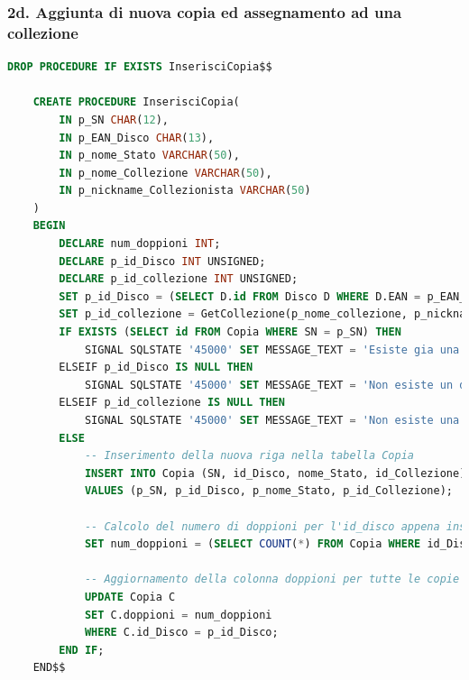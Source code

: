 \documentclass{article}
\begin{document}
\subsubsection*{2d. Aggiunta di nuova copia ed assegnamento ad una collezione}
\begin{lstlisting}[language=SQL]
    DROP PROCEDURE IF EXISTS InserisciCopia$$

    CREATE PROCEDURE InserisciCopia(
        IN p_SN CHAR(12),
        IN p_EAN_Disco CHAR(13),
        IN p_nome_Stato VARCHAR(50),
        IN p_nome_Collezione VARCHAR(50),
        IN p_nickname_Collezionista VARCHAR(50)
    )
    BEGIN
        DECLARE num_doppioni INT;
        DECLARE p_id_Disco INT UNSIGNED;
        DECLARE p_id_collezione INT UNSIGNED;
        SET p_id_Disco = (SELECT D.id FROM Disco D WHERE D.EAN = p_EAN_Disco);
        SET p_id_collezione = GetCollezione(p_nome_collezione, p_nickname_Collezionista);
        IF EXISTS (SELECT id FROM Copia WHERE SN = p_SN) THEN
            SIGNAL SQLSTATE '45000' SET MESSAGE_TEXT = 'Esiste gia una copia con questo SN';
        ELSEIF p_id_Disco IS NULL THEN 
            SIGNAL SQLSTATE '45000' SET MESSAGE_TEXT = 'Non esiste un disco con questo EAN';
        ELSEIF p_id_collezione IS NULL THEN
            SIGNAL SQLSTATE '45000' SET MESSAGE_TEXT = 'Non esiste una collezione con questo nome associata a questo nickname';
        ELSE    
            -- Inserimento della nuova riga nella tabella Copia
            INSERT INTO Copia (SN, id_Disco, nome_Stato, id_Collezione) 
            VALUES (p_SN, p_id_Disco, p_nome_Stato, p_id_Collezione);
        
            -- Calcolo del numero di doppioni per l'id_disco appena inserito
            SET num_doppioni = (SELECT COUNT(*) FROM Copia WHERE id_Disco = p_id_Disco);
            
            -- Aggiornamento della colonna doppioni per tutte le copie con lo stesso id_disco
            UPDATE Copia C
            SET C.doppioni = num_doppioni
            WHERE C.id_Disco = p_id_Disco;
        END IF;
    END$$
\end{lstlisting}
                
\end{document}
